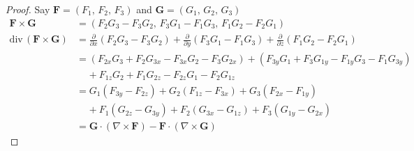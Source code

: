 \documentclass{article}
\newcommand{\parti}[1]{\frac{\partial}{\partial #1}}
\newcommand{\divt}{\text{div} \,}
\begin{document}
\begin{enumerate}
\begin{enumerate}
\begin{enumerate}[label=(\roman*)]
            \begin{proof}
            Say $\boldsymbol F = (F_1,\, F_2,\, F_3)$ and 
            $\boldsymbol G = (G_1,\, G_2,\, G_3)$
            \begin{align*}
                \boldsymbol F \times \boldsymbol G 
                &= (F_2G_3 - F_3G_2,\, F_3G_1 - F_1G_3,\, F_1G_2 - F_2G_1) \\
                \divt ( \boldsymbol F \times \boldsymbol G)
                &= \parti{x}(F_2G_3 - F_3G_2) + \parti{y}(F_3G_1 - F_1G_3)
                + \parti{z}(F_1G_2 - F_2G_1) \\
                &= (F_{2x}G_3 + F_{2}G_{3x} - F_{3x}G_2- F_3G_{2x}) 
                + (F_{3y}G_1 + F_{3}G_{1y} - F_{1y}G_3- F_1G_{3y}) \\
                &\; \; \; \; + F_{1z}G_2 + F_1G_{2z} - F_{2z}G_1 - F_2G_{1z} \\
                &= G_1 (F_{3y} - F_{2z}) + G_2 (F_{1z} - F_{3x}) 
                + G_3 (F_{2x} - F_{1y}) \\
                &\; \; \; \; + F_1 (G_{2z} - G_{3y}) + F_2 (G_{3x} - G_{1z}) 
                + F_3 (G_{1y} - G_{2x}) \\
                &= \boldsymbol G \cdot (\nabla \times \boldsymbol F)
                - \boldsymbol F \cdot (\nabla \times \boldsymbol G)
            \end{align*} 
            \end{proof}


\end{enumerate}
\end{enumerate}
\end{enumerate}
\end{document}
